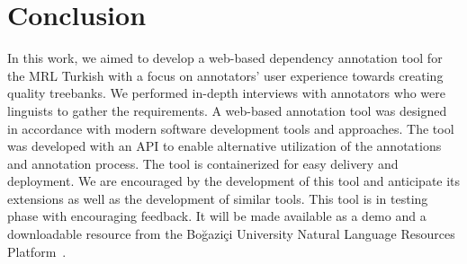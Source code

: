 \section{Conclusion}
\label{sec:conclusion}

In this work, we aimed to develop a web-based dependency annotation tool for the MRL Turkish with a focus on annotators' user experience towards creating quality treebanks. 
We performed in-depth interviews with annotators who were linguists to gather the requirements. 
A web-based annotation tool was designed in accordance with modern software development tools and approaches. 
The tool was developed with an API to enable alternative utilization of the annotations and annotation process. 
The tool is containerized for easy delivery and deployment. 
We are encouraged by the development of this tool and anticipate its extensions as well as the development of similar tools. 
This tool is in testing phase with encouraging feedback. It will be made available as a demo and a downloadable resource from 
the Boğaziçi University Natural Language Resources Platform~\cite{DIP}.
